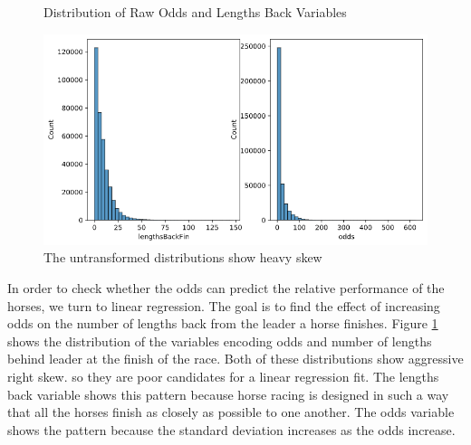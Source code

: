 \documentclass{article}
\begin{document}
\begin{figure}
    \centering
    \textrm{Distribution of Raw Odds and Lengths Back Variables}\par \medskip
    \includegraphics[width=12cm]{images/lengths_odds_no_trans_chart.png}

    \caption{The untransformed distributions show heavy skew} 
    \label{figure:oddsLengthsNoTrans}   
\end{figure}

In order to check whether the odds can predict the relative performance of the horses, we turn to linear regression. The goal is to find the effect of increasing odds on the number of lengths back from the leader a horse finishes. Figure \ref{figure:oddsLengthsNoTrans} shows the distribution of the variables encoding odds and number of lengths behind leader at the finish of the race. Both of these distributions show aggressive right skew.  so they are poor candidates for a linear regression fit. The lengths back variable shows this pattern because horse racing is designed in such a way that all the horses finish as closely as possible to one another. The odds variable shows the pattern because the standard deviation increases as the odds increase. 
\end{document}

